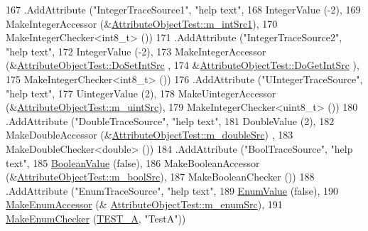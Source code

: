 \begin{DoxyCode}
167       .AddAttribute (\textcolor{stringliteral}{"IntegerTraceSource1"}, \textcolor{stringliteral}{"help text"},
168                      IntegerValue (-2),
169                      MakeIntegerAccessor (&\hyperlink{classAttributeObjectTest_a93e2dd383ed17746c8899f08fd5105bf}{AttributeObjectTest::m\_intSrc1}),
170                      MakeIntegerChecker<int8\_t> ())
171       .AddAttribute (\textcolor{stringliteral}{"IntegerTraceSource2"}, \textcolor{stringliteral}{"help text"},
172                      IntegerValue (-2),
173                      MakeIntegerAccessor (&\hyperlink{classAttributeObjectTest_a09baaccde183a0f57322e3eabe5a4e0e}{AttributeObjectTest::DoSetIntSrc}
      ,
174                                           &\hyperlink{classAttributeObjectTest_af4e64c6ce08f42309d618592589824d5}{AttributeObjectTest::DoGetIntSrc}
      ),
175                      MakeIntegerChecker<int8\_t> ())
176       .AddAttribute (\textcolor{stringliteral}{"UIntegerTraceSource"}, \textcolor{stringliteral}{"help text"},
177                      UintegerValue (2),
178                      MakeUintegerAccessor (&\hyperlink{classAttributeObjectTest_ab4b9231657879777659a0c37395be228}{AttributeObjectTest::m\_uintSrc}),
179                      MakeIntegerChecker<uint8\_t> ())
180       .AddAttribute (\textcolor{stringliteral}{"DoubleTraceSource"}, \textcolor{stringliteral}{"help text"},
181                      DoubleValue (2),
182                      MakeDoubleAccessor (&\hyperlink{classAttributeObjectTest_a75cec1d44ba434e460411e3442e9bcdb}{AttributeObjectTest::m\_doubleSrc})
      ,
183                      MakeDoubleChecker<double> ())
184       .AddAttribute (\textcolor{stringliteral}{"BoolTraceSource"}, \textcolor{stringliteral}{"help text"},
185                      \hyperlink{classns3_1_1BooleanValue}{BooleanValue} (\textcolor{keyword}{false}),
186                      MakeBooleanAccessor (&\hyperlink{classAttributeObjectTest_abf48b5a24349888503285895c4b3889a}{AttributeObjectTest::m\_boolSrc}),
187                      MakeBooleanChecker ())
188       .AddAttribute (\textcolor{stringliteral}{"EnumTraceSource"}, \textcolor{stringliteral}{"help text"},
189                      \hyperlink{classns3_1_1EnumValue}{EnumValue} (\textcolor{keyword}{false}),
190                      \hyperlink{namespacens3_af5050739867ce63896dec011e332c8ec}{MakeEnumAccessor} (&
      \hyperlink{classAttributeObjectTest_ac2735627f880d78ab0f56f5b64f178a8}{AttributeObjectTest::m\_enumSrc}),
191                      \hyperlink{namespacens3_a48832781a2b521d3d0091e05ece30615}{MakeEnumChecker} (\hyperlink{classAttributeObjectTest_a7d0dfe3f27ac6d9338a92781caf287cbac83a7f877302882c60d200cc9cc67abe}{TEST\_A}, \textcolor{stringliteral}{"TestA"}))

\end{DoxyCode}
